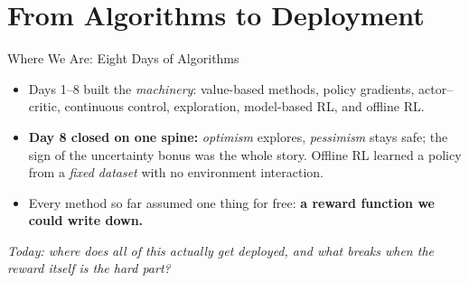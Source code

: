 \section{From Algorithms to Deployment}


\newcommand{\srcnote}[1]{%
  \begingroup
  \renewcommand{\thefootnote}{}%
  \footnote{#1}%
  \addtocounter{footnote}{-1}%
  \endgroup}

\begin{frame}{Where We Are: Eight Days of Algorithms}
\begin{itemize}\itemsep0.5em
    \item Days 1--8 built the \emph{machinery}: value-based methods, policy
          gradients, actor--critic, continuous control, exploration, model-based
          RL, and offline RL.
    \item \textbf{Day 8 closed on one spine:} \emph{optimism} explores,
          \emph{pessimism} stays safe; the sign of the uncertainty bonus was
          the whole story. Offline RL learned a policy from a \emph{fixed dataset}
          with no environment interaction.
    \item Every method so far assumed one thing for free: \textbf{a reward
          function we could write down.}
\end{itemize}
\vfill
\begin{center}
\itshape Today: where does all of this actually get deployed, and what breaks
when the reward itself is the hard part?
\end{center}
\end{frame}

